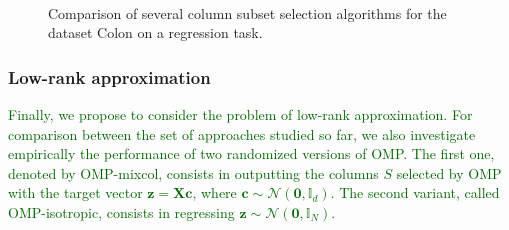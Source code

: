 \documentclass[twoside,11pt]{book}
\newcommand{\rev}[1]{\textcolor{darkgreen}{#1}}
\numberwithin{theorem}{chapter}
\numberwithin{definition}{chapter}
\numberwithin{proposition}{chapter}
\numberwithin{corollary}{chapter}
\numberwithin{example}{chapter}
\numberwithin{lemma}{chapter}
\numberwithin{assumption}{chapter}
\begin{document}
\begin{figure}
    \centering
    \captionsetup[subfigure]{justification=centering}
~
\caption{Comparison of several column subset selection algorithms for the dataset Colon on a regression task. \label{fig:supervised_and_unsupervised_regression}}
\end{figure}


\subsubsection{Low-rank approximation}\label{sec:num_sim_OMP_vs_CSSP_in_CSSP}
%
\rev{Finally, we propose to consider the problem of low-rank approximation.
For comparison between the set of approaches studied so far, we also  investigate empirically the performance of two randomized versions of OMP.
The first one, denoted by OMP-mixcol, consists in outputting the columns $S$ selected by OMP with the target vector $\mathbf{z} = \bm{X} \bm{c}$, where $\bm{c} \sim \mathcal{N}(\bm{0}, \mathbb{I}_{d})$. The second variant, called OMP-isotropic, consists in regressing
$\mathbf{z} \sim \mathcal{N}(\bm{0}, \mathbb{I}_{N})$.}
\end{document}
